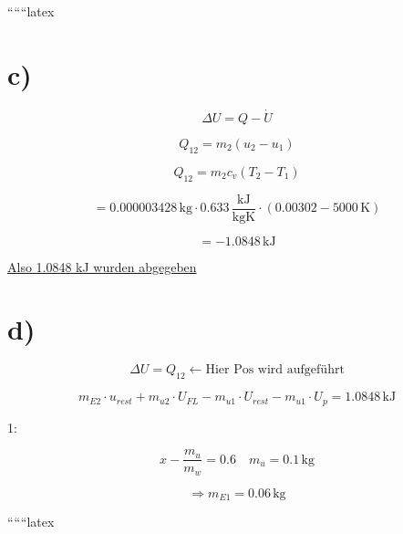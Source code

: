 ``````latex


\section*{c)}

\[
\Delta U = Q - \dot{U}
\]

\[
Q_{12} = m_2 (u_2 - u_1)
\]

\[
Q_{12} = m_2 c_v (T_2 - T_1)
\]

\[
= 0.000003428 \, \text{kg} \cdot 0.633 \, \frac{\text{kJ}}{\text{kgK}} \cdot (0.00302 - 5000 \, \text{K})
\]

\[
= -1.0848 \, \text{kJ}
\]

\underline{Also 1.0848 kJ wurden abgegeben}

\section*{d)}

\[
\Delta U = Q_{12} \leftarrow \text{Hier Pos wird aufgeführt}
\]

\[
m_{E2} \cdot u_{rest} + m_{u2} \cdot U_{FL} - m_{u1} \cdot U_{rest} - m_{u1} \cdot U_p = 1.0848 \, \text{kJ}
\]

1:

\[
x - \frac{m_u}{m_w} = 0.6 \quad m_u = 0.1 \, \text{kg}
\]

\[
\Rightarrow m_{E1} = 0.06 \, \text{kg}
\]

``````latex


